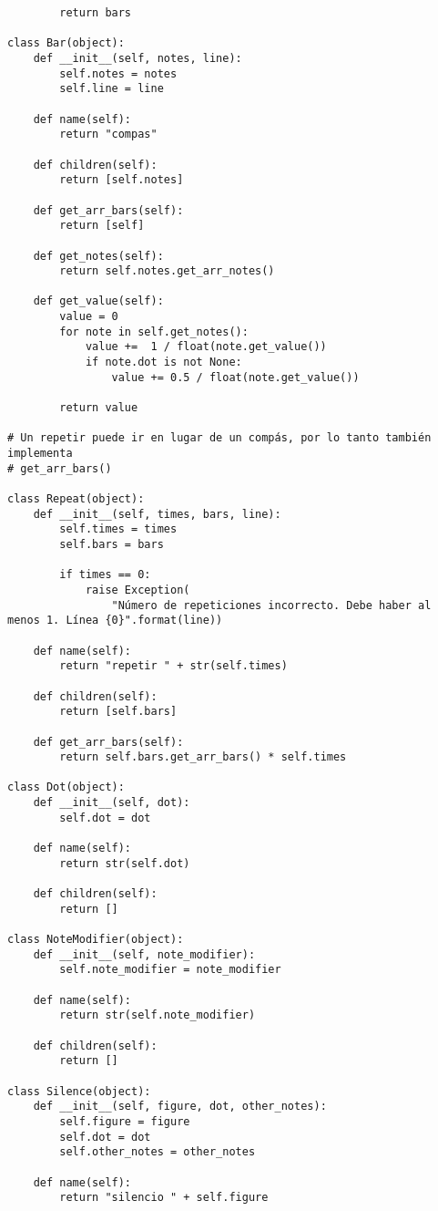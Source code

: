 \begin{verbatim}
        return bars

class Bar(object):
    def __init__(self, notes, line):
        self.notes = notes
        self.line = line

    def name(self):
        return "compas"

    def children(self):
        return [self.notes]

    def get_arr_bars(self):
        return [self]

    def get_notes(self):
        return self.notes.get_arr_notes()

    def get_value(self):
        value = 0
        for note in self.get_notes():
            value +=  1 / float(note.get_value())
            if note.dot is not None:
                value += 0.5 / float(note.get_value())

        return value

# Un repetir puede ir en lugar de un compás, por lo tanto también implementa
# get_arr_bars()

class Repeat(object):
    def __init__(self, times, bars, line):
        self.times = times
        self.bars = bars

        if times == 0:
            raise Exception(
                "Número de repeticiones incorrecto. Debe haber al menos 1. Línea {0}".format(line))

    def name(self):
        return "repetir " + str(self.times)

    def children(self):
        return [self.bars]

    def get_arr_bars(self):
        return self.bars.get_arr_bars() * self.times

class Dot(object):
    def __init__(self, dot):
        self.dot = dot

    def name(self):
        return str(self.dot)

    def children(self):
        return []

class NoteModifier(object):
    def __init__(self, note_modifier):
        self.note_modifier = note_modifier

    def name(self):
        return str(self.note_modifier)

    def children(self):
        return []

class Silence(object):
    def __init__(self, figure, dot, other_notes):
        self.figure = figure
        self.dot = dot
        self.other_notes = other_notes

    def name(self):
        return "silencio " + self.figure


\end{verbatim}
